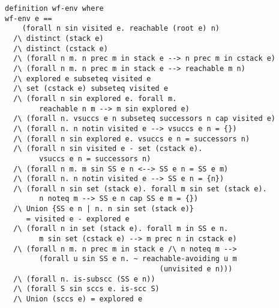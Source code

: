 \documentclass[sigplan,10pt,anonymous,review]{acmart}
\begin{document}
\begin{small}
\begin{lstlisting}[language=isabelle]
definition wf-env where
wf-env e ==
    (forall n sin visited e. reachable (root e) n)
  /\ distinct (stack e)
  /\ distinct (cstack e)
  /\ (forall n m. n prec m in stack e --> n prec m in cstack e)
  /\ (forall n m. n prec m in stack e --> reachable m n)
  /\ explored e subseteq visited e
  /\ set (cstack e) subseteq visited e
  /\ (forall n sin explored e. forall m. 
        reachable n m --> m sin explored e)
  /\ (forall n. vsuccs e n subseteq successors n cap visited e)
  /\ (forall n. n notin visited e --> vsuccs e n = {})
  /\ (forall n sin explored e. vsuccs e n = successors n)
  /\ (forall n sin visited e - set (cstack e). 
        vsuccs e n = successors n)
  /\ (forall n m. m sin SS e n <--> SS e n = SS e m)
  /\ (forall n. n notin visited e --> SS e n = {n})
  /\ (forall n sin set (stack e). forall m sin set (stack e).
        n noteq m --> SS e n cap SS e m = {})
  /\ Union {SS e n | n. n sin set (stack e)} 
     = visited e - explored e
  /\ (forall n in set (stack e). forall m in SS e n.
        m sin set (cstack e) --> m prec n in cstack e)
  /\ (forall n m. n prec m in stack e /\ n noteq m -->
        (forall u sin SS e n. ~ reachable-avoiding u m 
                                    (unvisited e n)))
  /\ (forall n. is-subscc (SS e n))
  /\ (forall S sin sccs e. is-scc S)
  /\ Union (sccs e) = explored e
\end{lstlisting}
\end{small}
\end{document}
